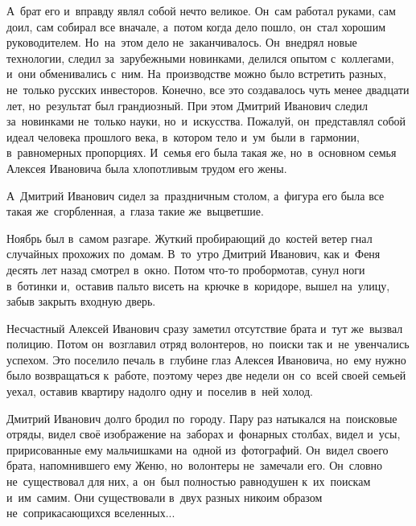 А~брат его и~вправду являл собой нечто великое.
Он~сам работал руками, сам доил, сам собирал все вначале, а~потом когда дело пошло, он~стал хорошим руководителем.
Но~на~этом дело не~заканчивалось.
Он~внедрял новые технологии, следил за~зарубежными новинками, делился опытом с~коллегами, и~они обменивались с~ним.
На~производстве можно было встретить разных, не~только русских инвесторов.
Конечно, все это создавалось чуть менее двадцати лет, но~результат был грандиозный.
При этом Дмитрий Иванович следил за~новинками не~только науки, но~и~искусства.
Пожалуй, он~представлял собой идеал человека прошлого века, в~котором тело и~ум~были в~гармонии, в~равномерных пропорциях.
И~семья его была такая же, но~в~основном семья Алексея Ивановича была хлопотливым трудом его жены.

А~Дмитрий Иванович сидел за~праздничным столом, а~фигура его была все такая же~сгорбленная, а~глаза такие же~выцветшие.

Ноябрь был в~самом разгаре.
Жуткий пробирающий до~костей ветер гнал случайных прохожих по~домам.
В~то~утро Дмитрий Иванович, как и~Феня десять лет назад смотрел в~окно.
Потом что-то пробормотав, сунул ноги в~ботинки и,~оставив пальто висеть на~крючке в~коридоре, вышел на~улицу, забыв закрыть входную дверь.

Несчастный Алексей Иванович сразу заметил отсутствие брата и~тут же~вызвал полицию.
Потом он~возглавил отряд волонтеров, но~поиски так и~не~увенчались успехом.
Это поселило печаль в~глубине глаз Алексея Ивановича, но~ему нужно было возвращаться к~работе, поэтому через две недели он~со~всей своей семьей уехал, оставив квартиру надолго одну и~поселив в~ней холод.

Дмитрий Иванович долго бродил по~городу.
Пару раз натыкался на~поисковые отряды, видел своё изображение на~заборах и~фонарных столбах, видел и~усы, пририсованные ему мальчишками на~одной из~фотографий.
Он~видел своего брата, напомнившего ему Женю, но~волонтеры не~замечали его.
Он~словно не~существовал для них, а~он~был полностью равнодушен к~их~поискам и~им~самим.
Они существовали в~двух разных никоим образом не~соприкасающихся вселенных...